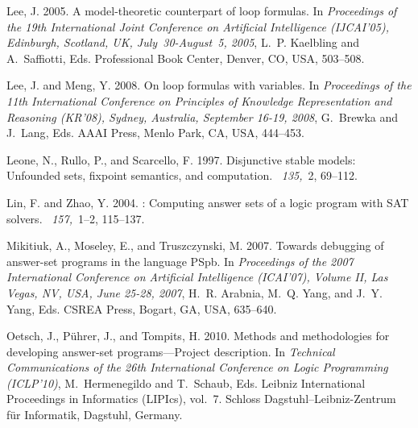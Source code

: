 \documentclass{tlp}
\begin{document}
\begin{thebibliography}{}
{\sc Lee, J.} 2005.
\newblock A model-theoretic counterpart of loop formulas.
\newblock In {\em Proceedings of the 19th International Joint Conference on
  Artificial Intelligence {\rm (}IJCAI'05{\rm )}, Edinburgh, Scotland, UK,
  July~30-August~5, 2005}, {L.~P. Kaelbling} {and} {A.~Saffiotti}, Eds.
  Professional Book Center, Denver, CO, USA, 503--508.

{\sc Lee, J.} {\sc and} {\sc Meng, Y.} 2008.
\newblock On loop formulas with variables.
\newblock In {\em Proceedings of the 11th International Conference on
  Principles of Knowledge Representation and Reasoning {\rm (}KR'08{\rm )},
  Sydney, Australia, September 16-19, 2008}, {G.~Brewka} {and} {J.~Lang}, Eds.
  AAAI Press, Menlo Park, CA, USA, 444--453.

{\sc Leone, N.}, {\sc Rullo, P.}, {\sc and} {\sc Scarcello, F.} 1997.
\newblock Disjunctive stable models: Unfounded sets, fixpoint semantics, and
  computation.
~{\em 135,\/}~2, 69--112.

{\sc Lin, F.} {\sc and} {\sc Zhao, Y.} 2004.
: Computing answer sets of a logic program with {SAT} solvers.
~{\em 157,\/}~1--2, 115--137.

{\sc Mikitiuk, A.}, {\sc Moseley, E.}, {\sc and} {\sc Truszczynski, M.} 2007.
\newblock Towards debugging of answer-set programs in the language {PS}pb.
\newblock In {\em Proceedings of the 2007 International Conference on
  Artificial Intelligence {\rm (}ICAI'07{\rm )}, Volume {II}, Las Vegas, NV,
  USA, June 25-28, 2007}, {H.~R. Arabnia}, {M.~Q. Yang}, {and} {J.~Y. Yang},
  Eds. CSREA Press, Bogart, GA, USA, 635--640.

{\sc Oetsch, J.}, {\sc P\"uhrer, J.}, {\sc and} {\sc Tompits, H.} 2010.
\newblock Methods and methodologies for developing answer-set
  programs---{P}roject description.
\newblock In {\em Technical Communications of the 26th International Conference
  on Logic Programming {\rm (}ICLP'10{\rm)}}, {M.~Hermenegildo} {and}
  {T.~Schaub}, Eds. Leibniz International Proceedings in Informatics (LIPIcs),
  vol.~7. Schloss Dagstuhl--Leibniz-Zentrum f\"ur Informatik, Dagstuhl,
  Germany.


\end{thebibliography}
\end{document}
